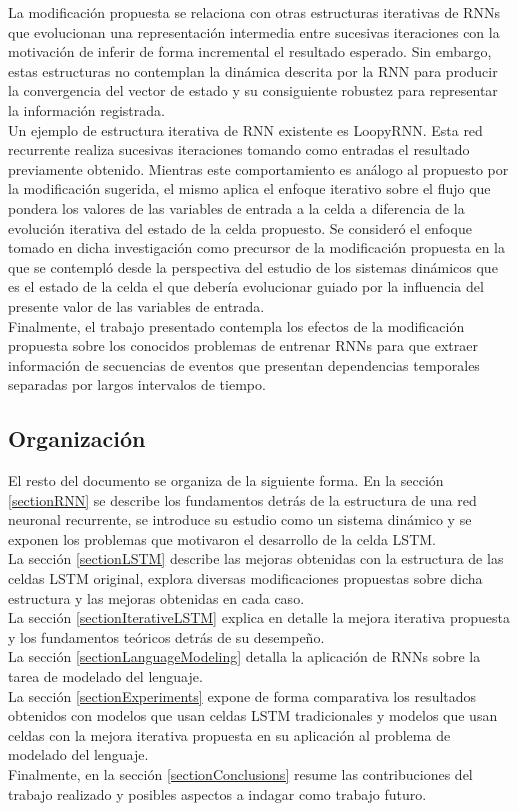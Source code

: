 \documentclass{article}
\begin{document}
	La modificación propuesta se relaciona con otras estructuras iterativas\cite{2BridgingGaps} de RNNs que evolucionan una representación intermedia entre sucesivas iteraciones con la motivación de inferir de forma incremental el resultado esperado. Sin embargo, estas estructuras no contemplan la dinámica descrita por la RNN para producir la convergencia del vector de estado y su consiguiente robustez para representar la información registrada.\\
	
	Un ejemplo de estructura iterativa de RNN existente es LoopyRNN\cite{17LoopyRNN}. Esta red recurrente realiza sucesivas iteraciones tomando como entradas el resultado previamente obtenido. Mientras este comportamiento es análogo al propuesto por la modificación sugerida, el mismo aplica el enfoque iterativo sobre el flujo que pondera los valores de las variables de entrada a la celda a diferencia de la evolución iterativa del estado de la celda propuesto. Se consideró el enfoque tomado en dicha investigación como precursor de la modificación propuesta en la que se contempló desde la perspectiva del estudio de los sistemas dinámicos que es el estado de la celda el que debería evolucionar guiado por la influencia del presente valor de las variables de entrada.\\%
	Finalmente, el trabajo presentado contempla los efectos de la modificación propuesta sobre los conocidos problemas de entrenar RNNs para que extraer información de secuencias de eventos que presentan dependencias temporales separadas por largos intervalos de tiempo.
	
	\subsection{Organización}
	El resto del documento se organiza de la siguiente forma. 
	En la sección \ref{sectionRNN} se describe los fundamentos detrás de la estructura de una red neuronal recurrente, se introduce su estudio como un sistema dinámico y se exponen los problemas que motivaron el desarrollo de la celda LSTM. \\
	La sección \ref{sectionLSTM} describe las mejoras obtenidas con la estructura de las celdas LSTM original, explora diversas modificaciones propuestas sobre dicha estructura y las mejoras obtenidas en cada caso.\\
	La sección \ref{sectionIterativeLSTM} explica en detalle la mejora iterativa propuesta y los fundamentos teóricos detrás de su desempeño.\\
	La sección \ref{sectionLanguageModeling} detalla la aplicación de RNNs sobre la tarea de modelado del lenguaje.\\
	La sección \ref{sectionExperiments} expone de forma comparativa los resultados obtenidos con modelos que usan celdas LSTM tradicionales y modelos que usan celdas con la mejora iterativa propuesta en su aplicación al problema de modelado del lenguaje. \\
	Finalmente, en la sección \ref{sectionConclusions} resume las contribuciones del trabajo realizado y posibles aspectos a indagar como trabajo futuro.
	
\end{document}

